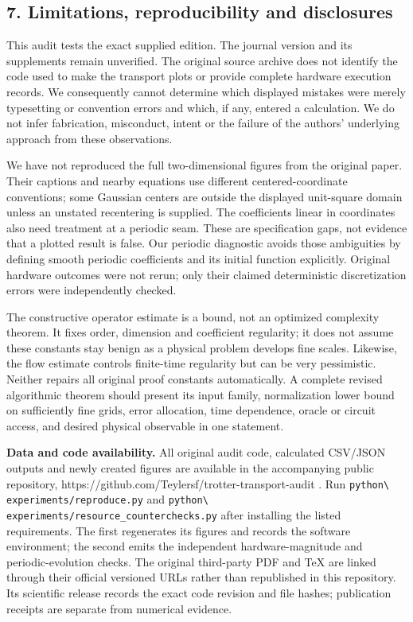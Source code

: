 \subsection{7. Limitations, reproducibility and
disclosures}\label{limitations-reproducibility-and-disclosures}

This audit tests the exact supplied edition. The journal version and its
supplements remain unverified. The original source archive does not
identify the code used to make the transport plots or provide complete
hardware execution records. We consequently cannot determine which
displayed mistakes were merely typesetting or convention errors and
which, if any, entered a calculation. We do not infer fabrication,
misconduct, intent or the failure of the authors' underlying approach
from these observations.

We have not reproduced the full two-dimensional figures from the
original paper. Their captions and nearby equations use different
centered-coordinate conventions; some Gaussian centers are outside the
displayed unit-square domain unless an unstated recentering is supplied.
The coefficients linear in coordinates also need treatment at a periodic
seam. These are specification gaps, not evidence that a plotted result
is false. Our periodic diagnostic avoids those ambiguities by defining
smooth periodic coefficients and its initial function explicitly.
Original hardware outcomes were not rerun; only their claimed
deterministic discretization errors were independently checked.

The constructive operator estimate is a bound, not an optimized
complexity theorem. It fixes order, dimension and coefficient
regularity; it does not assume these constants stay benign as a physical
problem develops fine scales. Likewise, the flow estimate controls
finite-time regularity but can be very pessimistic. Neither repairs all
original proof constants automatically. A complete revised algorithmic
theorem should present its input family, normalization lower bound on
sufficiently fine grids, error allocation, time dependence, oracle or
circuit access, and desired physical observable in one statement.

\textbf{Data and code availability.} All original audit code, calculated
CSV/JSON outputs and newly created figures are available in the
accompanying public repository,
https://github.com/Teylersf/trotter-transport-audit . Run
\nolinkurl{python\ experiments/reproduce.py} and
\nolinkurl{python\ experiments/resource_counterchecks.py} after installing
the listed requirements. The first regenerates its figures and records
the software environment; the second emits the independent
hardware-magnitude and periodic-evolution checks. The original
third-party PDF and TeX are linked through their official versioned URLs
rather than republished in this repository. Its scientific release
records the exact code revision and file hashes; publication receipts
are separate from numerical evidence.

